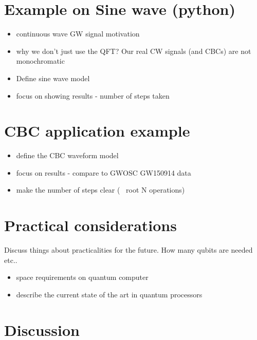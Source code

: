 \documentclass[aps,prd,nofootinbib,twocolumn,reprint,superscriptaddress,showpacs,showkeys,longbibliography]{revtex4-1}
\begin{document}
\section{Example on Sine wave (python)}\label{sec:sineexample}

\begin{itemize}
\item continuous wave GW signal motivation
\item why we don't just use the QFT? Our real CW signals (and CBCs) are not monochromatic
\item Define sine wave model
\item focus on showing results - number of steps taken
\end{itemize}

\section{CBC application example}\label{sec:cbcexample}

\begin{itemize}
\item define the CBC waveform model
\item focus on results - compare to GWOSC GW150914 data
\item make the number of steps clear (~ root N operations)
\end{itemize}

\section{Practical considerations}\label{sec:intro}

Discuss things about practicalities for the future. How many qubits are needed
etc.. 

\begin{itemize}
\item space requirements on quantum computer
\item describe the current state of the art in quantum processors
\end{itemize}

\section{Discussion}\label{sec:discussion}
\end{document}
